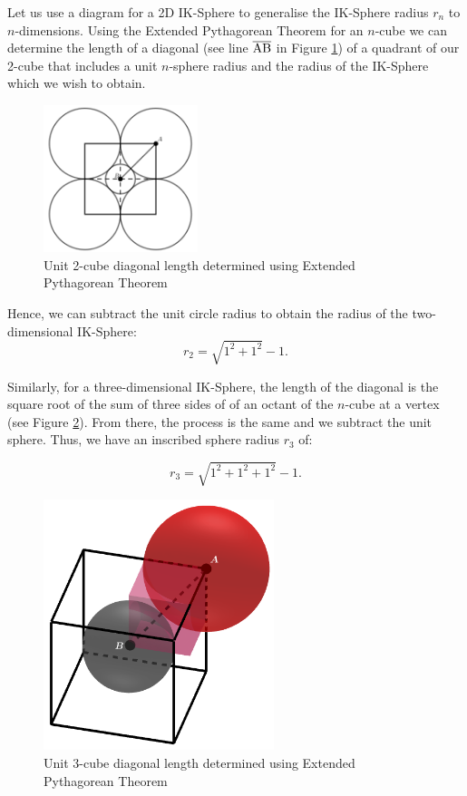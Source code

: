 Let us use a diagram for a 2D IK-Sphere to generalise the IK-Sphere radius $r_n$ to $n$-dimensions. Using the Extended Pythagorean Theorem for an $n$-cube we can determine the length of a diagonal (see line $\overline{\rm AB}$ in Figure \ref{fig:2d diagonal}) of a quadrant of our 2-cube that includes a unit $n$-sphere radius and the radius of the IK-Sphere which we wish to obtain. 
\begin{figure}[h]
    \centering
    \includegraphics[width=0.4\textwidth]{images/diagonal 2d.png}
    \caption{\label{fig:2d diagonal}Unit 2-cube diagonal length determined using Extended Pythagorean Theorem}
\end{figure}

\noindent Hence, we can subtract the unit circle radius to obtain the radius of the two-dimensional IK-Sphere: $$r_2 = \sqrt{1^2+1^2}-1.$$  %

Similarly, for a three-dimensional IK-Sphere, the length of the diagonal is the square root of the sum of three sides of of an octant of the $n$-cube at a vertex (see Figure \ref{fig:3d diagonal}). From there, the process is the same and we subtract the unit sphere. Thus, we have an inscribed sphere radius $r_3$ of: 

\begin{equation*}
    r_3=\sqrt{1^2+1^2+1^2}-1.
\end{equation*}

\begin{figure}[H]
    \centering
    \includegraphics[width=0.6\textwidth]{images/3d diagonal.png}
    \caption{\label{fig:3d diagonal}Unit 3-cube diagonal length determined using Extended Pythagorean Theorem}
\end{figure}

